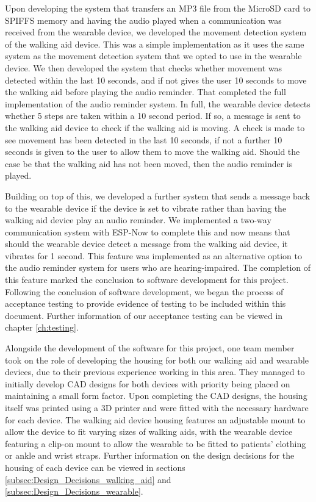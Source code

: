             Upon developing the system that transfers an MP3 file from the MicroSD card to SPIFFS memory and having the audio played when a communication was received from the wearable device, we developed the movement detection system of the walking aid device. This was a simple implementation as it uses the same system as the movement detection system that we opted to use in the wearable device. We then developed the system that checks whether movement was detected within the last 10 seconds, and if not gives the user 10 seconds to move the walking aid before playing the audio reminder. That completed the full implementation of the audio reminder system. In full, the wearable device detects whether 5 steps are taken within a 10 second period. If so, a message is sent to the walking aid device to check if the walking aid is moving. A check is made to see movement has been detected in the last 10 seconds, if not a further 10 seconds is given to the user to allow them to move the walking aid. Should the case be that the walking aid has not been moved, then the audio reminder is played.

            Building on top of this, we developed a further system that sends a message back to the wearable device if the device is set to vibrate rather than having the walking aid device play an audio reminder. We implemented a two-way communication system with ESP-Now to complete this and now means that should the wearable device detect a message from the walking aid device, it vibrates for 1 second. This feature was implemented as an alternative option to the audio reminder system for users who are hearing-impaired. The completion of this feature marked the conclusion to software development for this project. Following the conclusion of software development, we began the process of acceptance testing to provide evidence of testing to be included within this document. Further information of our acceptance testing can be viewed in chapter \ref{ch:testing}.

            Alongside the development of the software for this project, one team member took on the role of developing the housing for both our walking aid and wearable devices, due to their previous experience working in this area. They managed to initially develop CAD designs for both devices with priority being placed on maintaining a small form factor. Upon completing the CAD designs, the housing itself was printed using a 3D printer and were fitted with the necessary hardware for each device. The walking aid device housing features an adjustable mount to allow the device to fit varying sizes of walking aids, with the wearable device featuring a clip-on mount to allow the wearable to be fitted to patients' clothing or ankle and wrist straps. Further information on the design decisions for the housing of each device can be viewed in sections \ref{subsec:Design_Decisions_walking_aid} and \ref{subsec:Design_Decisions_wearable}.


